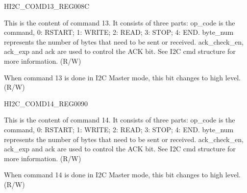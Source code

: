 \begin{register}{H}{I2C\_COMD13\_REG}{\hexprefix{}008C}\label{regdesc:I2CCOMD13REG}
%
%
%
\regnewline%
\begin{regdesc}\begin{reglist}
\label{fielddesc:I2CCOMMAND13}\item [I2C\_COMMAND13] This is the content of command 13. It consists of three parts:
op\_code is the command, 0: RSTART; 1: WRITE; 2: READ; 3: STOP; 4: END.
byte\_num represents the number of bytes that need to be sent or received.
ack\_check\_en, ack\_exp and ack are used to control the ACK bit. See I2C cmd structure for more information. (R/W)
\label{fielddesc:I2CCOMMAND13DONE}\item [I2C\_COMMAND13\_DONE] When command 13 is done in I2C Master mode, this bit changes to high level. (R/W)
\end{reglist}\end{regdesc}
\end{register}


\begin{register}{H}{I2C\_COMD14\_REG}{\hexprefix{}0090}\label{regdesc:I2CCOMD14REG}
%
%
%
\regnewline%
\begin{regdesc}\begin{reglist}
\label{fielddesc:I2CCOMMAND14}\item [I2C\_COMMAND14] This is the content of command 14. It consists of three parts:
op\_code is the command, 0: RSTART; 1: WRITE; 2: READ; 3: STOP; 4: END.
byte\_num represents the number of bytes that need to be sent or received.
ack\_check\_en, ack\_exp and ack are used to control the ACK bit. See I2C cmd structure for more information. (R/W)
\label{fielddesc:I2CCOMMAND14DONE}\item [I2C\_COMMAND14\_DONE] When command 14 is done in I2C Master mode, this bit changes to high level. (R/W)
\end{reglist}\end{regdesc}
\end{register}


